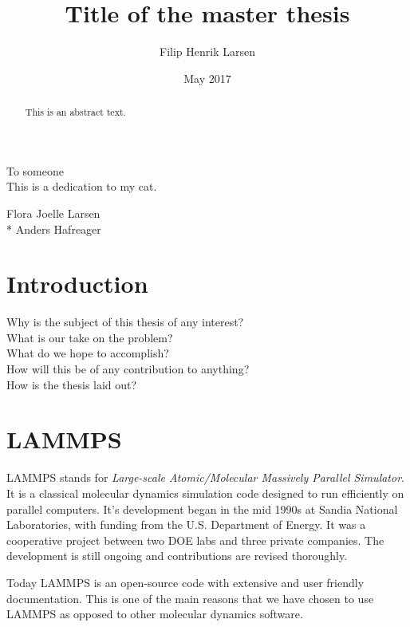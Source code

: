 \documentclass[twoside,english]{uiofysmaster}
\author{Filip Henrik Larsen}
\title{Title of the master thesis}
\date{May 2017}
\begin{document}
\maketitle

\begin{abstract}
This is an abstract text.
\end{abstract}

\begin{dedication}
  To someone
  \\\vspace{12pt}
  This is a dedication to my cat.
\end{dedication}

\begin{acknowledgements}
  Flora Joelle Larsen\\*
  Anders Hafreager
\end{acknowledgements}

\tableofcontents

\chapter{Introduction}

Why is the subject of this thesis of any interest?\\
What is our take on the problem?\\
What do we hope to accomplish?\\
How will this be of any contribution to anything?\\
How is the thesis laid out?



\chapter{LAMMPS}

LAMMPS stands for \textit{Large-scale Atomic/Molecular Massively Parallel Simulator}. It is a classical molecular dynamics simulation code designed to run efficiently on parallel computers. It's development began in the mid 1990s at Sandia National Laboratories, with funding from the U.S. Department of Energy. It was a cooperative project between two DOE labs and three private companies. The development is still ongoing and contributions are revised thoroughly. 

Today LAMMPS is an open-source code with extensive and user friendly documentation. This is one of the main reasons that we have chosen to use LAMMPS as opposed to other molecular dynamics software. 
\end{document}

